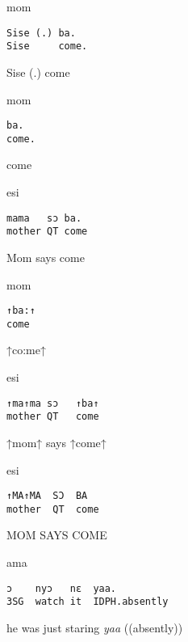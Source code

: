 \documentclass[output=paper]{langsci/langscibook}
\begin{document}
\vspace{-1mm}
%
\begin{mdframednoverticalspace}[style=firstfoc]
%
\begin{transbox}{1}{mom}
\begin{verbatim}
Sise (.) ba.
Sise     come.
\end{verbatim}
Sise (.) come
\end{transbox}
\end{mdframednoverticalspace}
%
%
\begin{transbox}{3}{mom}
\begin{verbatim}
ba.
come.
\end{verbatim}
come
\end{transbox}
%
%
\begin{transbox}{5}{esi}
\begin{verbatim}
mama   sɔ ba.
mother QT come
\end{verbatim}
Mom  says come
\end{transbox}
%
\begin{transbox}{6}{mom}
\begin{verbatim}
↑ba:↑
come
\end{verbatim}
↑co:me↑
\end{transbox}
%
%
\begin{transbox}{8}{esi}
\begin{verbatim}
↑ma↑ma sɔ   ↑ba↑
mother QT   come
\end{verbatim}
↑mom↑  says ↑come↑
\end{transbox}
%
%
\begin{transbox}{10}{esi}
\begin{verbatim}
↑MA↑MA  SƆ  BA
mother  QT  come
\end{verbatim}
MOM SAYS COME
\end{transbox}
\begin{mdframednoverticalspace}[style=secondfoc]
\end{mdframednoverticalspace}
\begin{transbox}{12}{ama}
\begin{verbatim}
ɔ    nyɔ   nɛ  yaa.
3SG  watch it  IDPH.absently
\end{verbatim}
{he} was just staring \textit{yaa} ((absently))
\end{transbox}\vspace{1mm}
%
\vspace{-1mm}
%
\\
\end{document}
